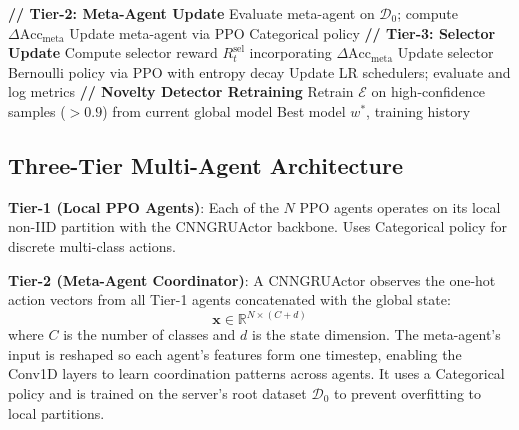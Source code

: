 \documentclass[conference]{IEEEtran}
\begin{document}
\begin{algorithm}[t]
\begin{algorithmic}[1]
    \ENDFOR
    \STATE \textbf{// Tier-2: Meta-Agent Update}
        \STATE Evaluate meta-agent on $\mathcal{D}_0$; compute $\Delta\mathrm{Acc}_{\mathrm{meta}}$
        \STATE Update meta-agent via PPO Categorical policy
    \ENDIF
    \STATE \textbf{// Tier-3: Selector Update}
    \STATE Compute selector reward $R_t^{\mathrm{sel}}$ incorporating $\Delta\mathrm{Acc}_{\mathrm{meta}}$
    \STATE Update selector Bernoulli policy via PPO with entropy decay
    \STATE Update LR schedulers; evaluate and log metrics
    \STATE \textbf{// Novelty Detector Retraining}
        \STATE Retrain $\mathcal{E}$ on high-confidence samples ($>0.9$) from current global model
    \ENDIF
\ENDFOR
\RETURN Best model $w^*$, training history
\end{algorithmic}
\end{algorithm}

\subsection{Three-Tier Multi-Agent Architecture}

\textbf{Tier-1 (Local PPO Agents)}: Each of the $N$ PPO agents operates on its local non-IID partition with the CNNGRUActor backbone. Uses Categorical policy for discrete multi-class actions.

\textbf{Tier-2 (Meta-Agent Coordinator)}: A CNNGRUActor observes the one-hot action vectors from all Tier-1 agents concatenated with the global state:
\begin{equation}
\mathbf{x} \in \mathbb{R}^{N \times (C + d)}
\end{equation}
where $C$ is the number of classes and $d$ is the state dimension. The meta-agent's input is reshaped so each agent's features form one timestep, enabling the Conv1D layers to learn coordination patterns across agents. It uses a Categorical policy and is trained on the server's root dataset $\mathcal{D}_0$ to prevent overfitting to local partitions.
\end{document}
